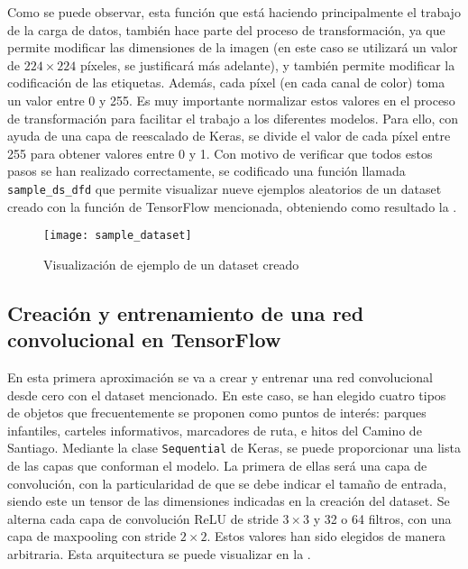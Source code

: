 			Como se puede observar, esta función que está haciendo principalmente el trabajo de la carga de datos, también hace parte del proceso de transformación, ya que permite modificar las dimensiones de la imagen (en este caso se utilizará un valor de $224 \times 224$ píxeles, se justificará más adelante), y también permite modificar la codificación de las etiquetas. Además, cada píxel (en cada canal de color) toma un valor entre 0 y 255. Es muy importante normalizar estos valores en el proceso de transformación para facilitar el trabajo a los diferentes modelos. Para ello, con ayuda de una capa de reescalado de Keras, se divide el valor de cada píxel entre 255 para obtener valores entre 0 y 1. Con motivo de verificar que todos estos pasos se han realizado correctamente, se codificado una función llamada \texttt{sample\_ds\_dfd} que permite visualizar nueve ejemplos aleatorios de un dataset creado con la función de TensorFlow mencionada, obteniendo como resultado la . \\
			
			\begin{figure}
				\centering
				\texttt{[image: sample\_dataset]}
				\caption{Visualización de ejemplo de un dataset creado}
				\label{fig:sample_dataset}
			\end{figure}
			
		\subsection{Creación y entrenamiento de una red convolucional en TensorFlow}\label{subsec:crear_cnn}
		
			En esta primera aproximación se va a crear y entrenar una red convolucional desde cero con el dataset mencionado. En este caso, se han elegido cuatro tipos de objetos que frecuentemente se proponen como puntos de interés: parques infantiles, carteles informativos, marcadores de ruta, e hitos del Camino de Santiago. Mediante la clase \texttt{Sequential} de Keras, se puede proporcionar una lista de las capas que conforman el modelo. La primera de ellas será una capa de convolución, con la particularidad de que se debe indicar el tamaño de entrada, siendo este un tensor de las dimensiones indicadas en la creación del dataset. Se alterna cada capa de convolución ReLU de stride $3 \times 3$ y 32 o 64 filtros, con una capa de maxpooling con stride $2 \times 2$. Estos valores han sido elegidos de manera arbitraria. Esta arquitectura se puede visualizar en la . \\
			
